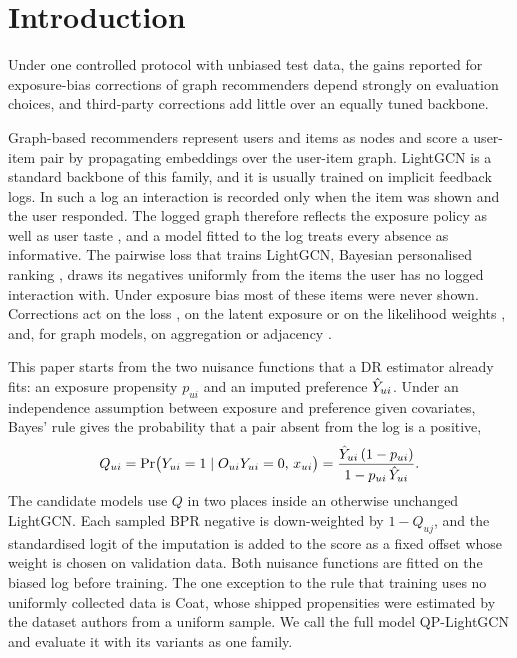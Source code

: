 \section{Introduction}\label{sec:intro}

Under one controlled protocol with unbiased test data, the gains reported for exposure-bias corrections of graph
recommenders depend strongly on evaluation choices, and third-party corrections add little over an equally tuned
backbone.

Graph-based recommenders represent users and items as nodes and score a user-item pair by propagating embeddings over
the user-item graph. LightGCN \citep{he2020lightgcn} is a standard backbone of this family, and it is usually trained on
implicit feedback logs. In such a log an interaction is recorded only when the item was shown and the user responded.
The logged graph therefore reflects the exposure policy as well as user taste \citep{marlin2009collaborative,chen2023bias},
and a model fitted to the log treats every absence as informative. The pairwise loss that trains LightGCN, Bayesian
personalised ranking \citep{rendle2009bpr}, draws its negatives uniformly from the items the user has no logged
interaction with. Under exposure bias most of these items were never shown. Corrections act on the loss
\citep{schnabel2016,wang2019drjl,guo2021mrdr}, on the latent exposure or on the likelihood weights
\citep{liang2016exposure,saito2020unbiased}, and, for graph models, on aggregation or adjacency
\citep{kim2022navip,zhao2022radjnorm,islam2026ppd}.

This paper starts from the two nuisance functions that a DR estimator already fits: an exposure propensity $p_{ui}$ and
an imputed preference $\hat Y_{ui}$. Under an independence assumption between exposure and preference given covariates,
Bayes' rule gives the probability that a pair absent from the log is a positive,
\begin{equation}\label{eq:Qintro}
Q_{ui}=\Pr\bigl(Y_{ui}=1\mid O_{ui}Y_{ui}=0,\,x_{ui}\bigr)
=\frac{\hat Y_{ui}\,(1-p_{ui})}{1-p_{ui}\,\hat Y_{ui}}.
\end{equation}
The candidate models use $Q$ in two places inside an otherwise unchanged LightGCN. Each sampled BPR negative is
down-weighted by $1-Q_{uj}$, and the standardised logit of the imputation is added to the score as a fixed offset whose
weight is chosen on validation data. Both nuisance functions are fitted on the biased log before training. The one
exception to the rule that training uses no uniformly collected data is Coat, whose shipped propensities were estimated
by the dataset authors from a uniform sample. We call the full model QP-LightGCN and evaluate it with its variants as one
family.

